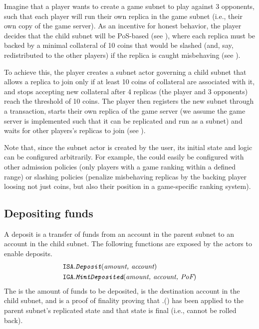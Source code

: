 \begin{example}
\label{ex:create-game-subnet}

Imagine that a player wants to create a game subnet to play against 3 opponents,
such that each player will run their own replica in the game subnet (i.e., their own copy of the game server).
As an incentive for honest behavior, the player decides that the child subnet will be PoS-based (see ),
where each replica must be backed by a minimal collateral of 10 coins that would be slashed (and, say, redistributed to the other players) if the replica is caught misbehaving (see ).

To achieve this, the player creates a subnet actor governing a child subnet that allows a replica to join only if at least 10 coins of collateral are associated with it, and 
stops accepting new collateral after 4 replicas (the player and 3 opponents) reach the threshold of 10 coins.
The player then registers the new subnet through a  transaction, starts their own replica of the game server (we assume the game server is implemented such that it can be replicated and run as a subnet)
and waits for other players's replicas to join (see ).

Note that, since the subnet actor is created by the user, its initial state and logic can be configured arbitrarily.
For example, the \sa could easily be configured with other admission policies (only players with a game ranking within a defined range)
or slashing policies (penalize misbehaving replicas by the backing player loosing not just coins, but also their position in a game-specific ranking system).

\end{example}

\subsection{Depositing funds}
\label{sec:deposit}

A \gls{deposit} is a transfer of funds from an account in the parent subnet to an account in the child subnet.
The following functions are exposed by the \ipc actors to enable deposits.
\begin{align*}
    \texttt{ISA}.&\textit{\texttt{Deposit}}(\textit{amount, account})\\
    \texttt{IGA}.&\textit{\texttt{MintDeposited}}(\textit{amount, account, \textit{PoF}})
\end{align*}
The  is the amount of funds to be deposited,  is the destination account in the child subnet, and \funcParam{\pof} is a proof of finality proving that \sa.() has been applied to the parent subnet's replicated state and that state is final (i.e., cannot be rolled back).

